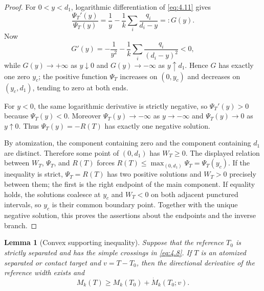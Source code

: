 \documentclass[11pt]{article}
\numberwithin{equation}{section}
\theoremstyle{plain}
\newtheorem{lemma}[theorem]{Lemma}
\theoremstyle{definition}
\theoremstyle{remark}
\newcommand{\1}{\mathbf 1}
\begin{document}
\begin{proof}
For $0<y<d_1$, logarithmic differentiation of \eqref{eq:4.11} gives
\[
 \frac{\Psi_T'(y)}{\Psi_T(y)}
 =\frac1y-\frac1k\sum_i\frac{q_i}{d_i-y}=:G(y).
\]
Now
\[
 G'(y)=-\frac1{y^2}-\frac1k\sum_i\frac{q_i}{(d_i-y)^2}<0,
\]
while $G(y)\to+\infty$ as $y\downarrow0$ and
$G(y)\to-\infty$ as $y\uparrow d_1$.  Hence $G$ has exactly one zero
$y_c$; the positive function $\Psi_T$ increases on $(0,y_c)$ and decreases
on $(y_c,d_1)$, tending to zero at both ends.

For $y<0$, the same logarithmic derivative is strictly negative, so
$\Psi_T'(y)>0$ because $\Psi_T(y)<0$.  Moreover $\Psi_T(y)\to-\infty$ as
$y\to-\infty$ and $\Psi_T(y)\to0$ as $y\uparrow0$.  Thus
$\Psi_T(y)=-R(T)$ has exactly one negative solution.

By atomization, the component containing zero and the component containing
$d_1$ are distinct.  Therefore some point of $(0,d_1)$ has $W_T\ge0$.
The displayed relation between $W_T$, $\Psi_T$, and $R(T)$ forces
$R(T)\le\max_{(0,d_1)}\Psi_T=\Psi_T(y_c)$.
If the inequality is strict, $\Psi_T=R(T)$ has two positive solutions and
$W_T>0$ precisely between them; the first is the right endpoint of the main
component.  If equality holds, the solutions coalesce at $y_c$ and
$W_T<0$ on both adjacent punctured intervals, so $y_c$ is their common
boundary point.  Together with the unique negative solution, this proves
the assertions about the endpoints and the inverse branch.
\end{proof}

\begin{lemma}[Convex supporting inequality]\label{lem:convex-support}
Suppose that the reference $T_0$ is strictly separated and has the simple
crossings in \eqref{eq:4.8}.  If $T$ is an atomized separated or contact
target and $v=T-T_0$, then the directional derivative of the reference
width exists and
\begin{equation}
 M_k(T)\ge M_k(T_0)+\dot M_k(T_0;v).
\label{eq:4.13}
\end{equation}
\end{lemma}
\end{document}
